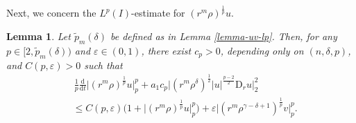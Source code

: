 \documentclass[11pt,reqno]{amsart}
\newtheorem{lem}{Lemma}[section]
\numberwithin{rk}{section}
\numberwithin{prop}{section}
\numberwithin{mydef}{section}
\numberwithin{lem}{section}
\numberwithin{equation}{section}
\numberwithin{thm}{section}
\begin{document}
Next, we concern the $L^p(I)$-estimate for $(r^m\rho)^{\frac{1}{p}} u$.

\begin{lem} \label{lem-u-lp}
Let $\tilde{p}_{m}(\delta)$ be defined as in {\rm Lemma \ref{lemma-uv-lp}}. Then, for any $p\in [2,\tilde{p}_{m}(\delta))$ and $\varepsilon\in (0,1)$, there exist $c_p>0$, depending only on $(n,\delta,p)$, and $C(p,\varepsilon)>0$ such that 
\begin{equation}\label{dt-u-p}
\begin{aligned}
&\,\frac{1}{p}\frac{\mathrm{d}}{\mathrm{d}t}\big|(r^m\rho)^{\frac{1}{p}} u\big|_{p}^{p} + a_1 c_p\big|(r^m\rho^\delta)^\frac{1}{2} |u|^\frac{p-2}{2}\mathrm{D}_r u\big|_2^2\\
&\leq C(p, \varepsilon)\big(1+\big|(r^m\rho)^\frac{1}{p}u\big|_{p}^{p}\big) + \varepsilon \big|(r^m\rho^{\gamma-\delta+1})^\frac{1}{p}v\big|_{p}^{p}.
\end{aligned}
\end{equation}
\end{lem}
\end{document}
